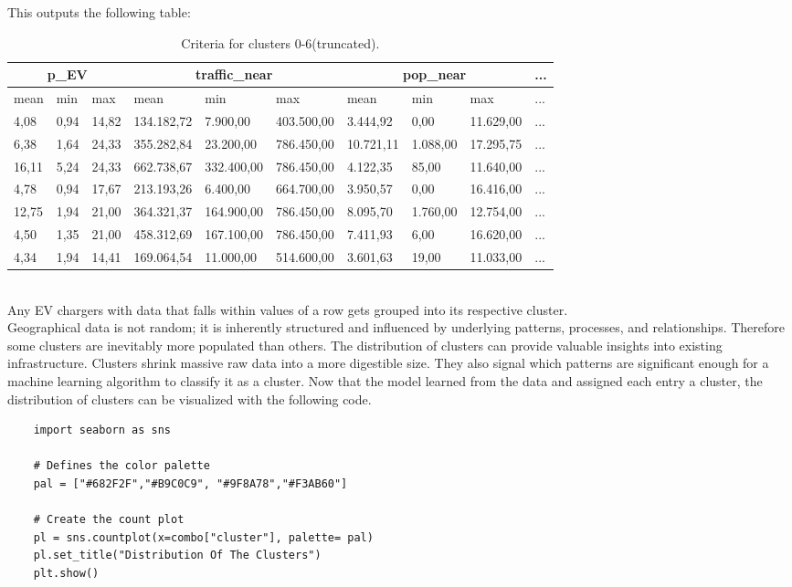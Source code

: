 This outputs the following table:
\begin{table}[!h]
\hskip -1.1cm
\begin{tabular}{|l|l|l|l|l|l|l|l|l|l}
\toprule
\multicolumn{3}{|c|}{p\_EV} & \multicolumn{3}{|c|}{traffic\_near} & \multicolumn{3}{|c|}{pop\_near} & \multicolumn{1}{r}{...} \\
\midrule
mean & min & max & mean & min & max & mean & min & max & ... \\
\midrule
4,08 & 0,94 & 14,82 & 134.182,72 & 7.900,00 & 403.500,00 & 3.444,92 & 0,00 & 11.629,00 & ...\\
6,38 & 1,64 & 24,33 & 355.282,84 & 23.200,00 & 786.450,00 & 10.721,11 & 1.088,00 & 17.295,75 & ...\\
16,11 & 5,24 & 24,33 & 662.738,67 & 332.400,00 & 786.450,00 & 4.122,35 & 85,00 & 11.640,00 & ...\\
4,78 & 0,94 & 17,67 & 213.193,26 & 6.400,00 & 664.700,00 & 3.950,57 & 0,00 & 16.416,00 & ...\\
12,75 & 1,94 & 21,00 & 364.321,37 & 164.900,00 & 786.450,00 & 8.095,70 & 1.760,00 & 12.754,00 & ...\\
4,50 & 1,35 & 21,00 & 458.312,69 & 167.100,00 & 786.450,00 & 7.411,93 & 6,00 & 16.620,00 & ...\\
4,34 & 1,94 & 14,41 & 169.064,54 & 11.000,00 & 514.600,00 & 3.601,63 & 19,00 & 11.033,00 & ...\\
\bottomrule
\end{tabular}
\caption{ Criteria for clusters 0-6(truncated). }
\end{table}\\
Any EV chargers with data that falls within values of a row gets grouped into its respective cluster.\\
Geographical data is not random; it is inherently structured and influenced by underlying patterns, processes, and relationships. Therefore some clusters are inevitably more populated than others. The distribution of clusters can provide valuable insights into existing infrastructure. Clusters shrink massive raw data into a more digestible size. They also signal which patterns are significant enough for a machine learning algorithm to classify it as a cluster. Now that the model learned from the data and assigned each entry a cluster, the distribution of clusters can be visualized with the following code.
\begin{verbatim}
    import seaborn as sns

    # Defines the color palette
    pal = ["#682F2F","#B9C0C9", "#9F8A78","#F3AB60"]
    
    # Create the count plot
    pl = sns.countplot(x=combo["cluster"], palette= pal)
    pl.set_title("Distribution Of The Clusters")
    plt.show()
\end{verbatim}
